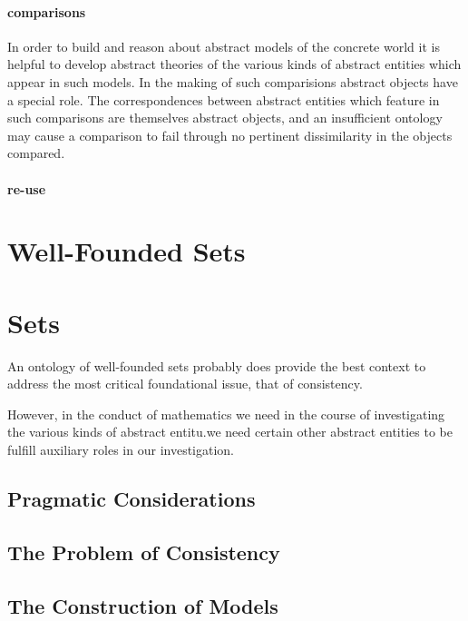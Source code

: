 \documentclass[numreferences]{rbjk}
\begin{document}
\begin{article}
\paragraph{comparisons}

In order to build and reason about abstract models of the concrete world it is helpful to develop abstract theories of the various kinds of abstract entities which appear in such models.
In the making of such comparisions abstract objects have a special role.
The correspondences between abstract entities which feature in such comparisons are themselves abstract objects, and an insufficient ontology may cause a comparison to fail through no pertinent dissimilarity in the objects compared.

\paragraph{re-use}




\section{Well-Founded Sets}

\section{Sets}

An ontology of well-founded sets probably does provide the best context to address the most critical foundational issue, that of consistency.

However, in the conduct of mathematics we need in the course of investigating the various kinds of abstract entitu.we need certain other abstract entities to be fulfill auxiliary roles in our investigation.


\subsection{Pragmatic Considerations}

\subsection{The Problem of Consistency}

\subsection{The Construction of Models} 

%
%


\end{article}
\end{document}
